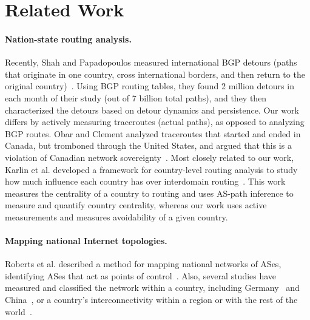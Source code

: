 \section{Related Work}
\label{related}

\paragraph{Nation-state routing analysis.}  Recently, Shah and
Papadopoulos measured international BGP detours (paths that originate in
one country, cross international borders, and then return to the
original country)~\cite{shah2015characterizing}.  Using BGP routing
tables, they found 2 million detours in each month of their study (out
of 7 billion total paths), and they then characterized the detours based
on detour dynamics and persistence.  Our work differs by actively
measuring traceroutes (actual paths), as opposed to analyzing BGP
routes.  Obar and Clement analyzed traceroutes
that started and ended in Canada, but tromboned through the United
States, and argued that
this is a violation of Canadian network
sovereignty~\cite{obar2012internet}.  Most closely related to our work,
Karlin et al. developed a framework for country-level
routing analysis to study how much influence each country has over
interdomain routing~\cite{karlin2009nation}.  This work measures the
centrality of a country to routing and uses AS-path inference to measure
and quantify country centrality, whereas our work uses active
measurements and measures avoidability of a given country. 

\paragraph{Mapping national Internet topologies.}  Roberts et
al. described a method for mapping national networks of ASes,
identifying ASes that act as points of control~\cite{roberts2011mapping}.  
Also, several studies have measured and classified the network within
a country, including
Germany~\cite{wahlisch2010framework,wahlisch2012exposing} and
China~\cite{zhou2007chinese}, or a country's interconnectivity within
a region or with the rest of the
world~\cite{bischof2015and,gupta2014peering,fanou2015diversity}.

